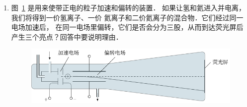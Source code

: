 \begin{enumerate}
\item 图~\ref{fig_B_6-45} 是用来使带正电的粒子加速和偏转的装置．
如果让氢和氦进入并电离，我们将得到一价氢离子、一价
氦离子和二价氦离子的混合物．它们经过同一电场加速后，
在同一电场里偏转，它们是否会分为三股，从而到达荧光屏后
产生三个亮点？回答中要说明理由．

\begin{figure}[htbp]
	\centering
	\includegraphics{fig/B/6-45.pdf}
	\caption{}\label{fig_B_6-45}
\end{figure}


\end{enumerate}




